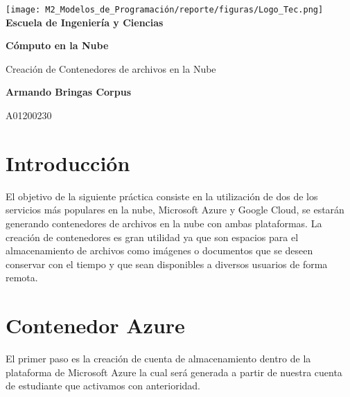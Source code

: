 \documentclass[12pt,a4paper]{article}
\begin{document}
\begin{titlepage}
    \centering
    \texttt{[image: M2\_Modelos\_de\_Programación/reporte/figuras/Logo\_Tec.png]}\\
    \vspace{.5cm}
    \bfseries\large Escuela de Ingeniería y Ciencias
        
    \vspace{5cm}
    \centering
    \textbf{\Huge Cómputo en la Nube}
    \vspace{0.5cm}
        
    {\Large Creación de Contenedores de archivos en la Nube}

    \vspace{5cm}
        
    \textbf{\LARGE Armando Bringas Corpus}
        
    \vspace{0.5cm}
        
    {\large A01200230}
        
    \vfill
        
\end{titlepage}

\section{Introducción}

El objetivo de la siguiente práctica consiste en la utilización de dos de los servicios más populares en la nube, Microsoft Azure y Google Cloud, se estarán generando contenedores de archivos en la nube con ambas plataformas. La creación de contenedores es gran utilidad ya que son espacios para el almacenamiento de archivos como imágenes o documentos que se deseen conservar con el tiempo y que sean disponibles a diversos usuarios de forma remota.

\section{Contenedor Azure}

El primer paso es la creación de cuenta de almacenamiento dentro de la plataforma de Microsoft Azure la cual será generada a partir de nuestra cuenta de estudiante que activamos con anterioridad.
\end{document}
